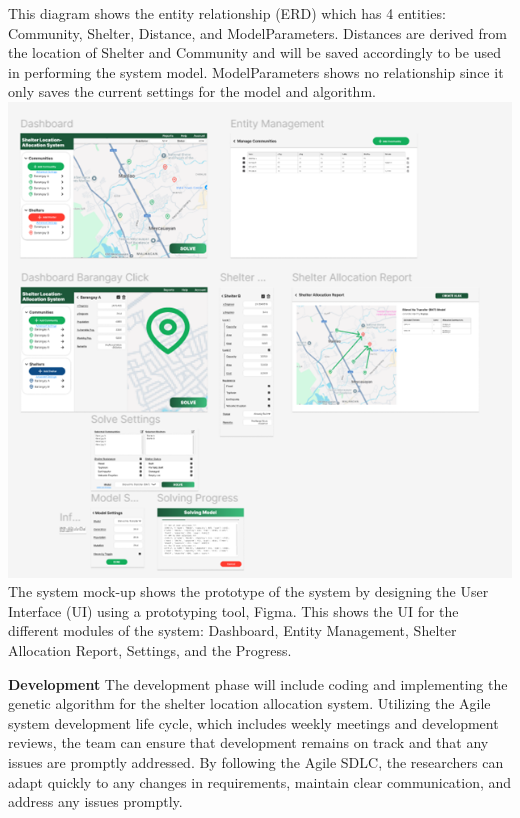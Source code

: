 This diagram shows the entity relationship (ERD) which has 4 entities: Community, Shelter, Distance, and ModelParameters. Distances are derived from the location of Shelter and Community and will be saved accordingly to be used in performing the system model. ModelParameters shows no relationship since it only saves the current settings for the model and algorithm.
\includegraphics{SYSTEM MOCKUP}
The system mock-up shows the prototype of the system by designing the User Interface (UI) using a prototyping tool, Figma. This shows the UI for the different modules of the system: Dashboard, Entity Management, Shelter Allocation Report, Settings, and the Progress.

\textbf{Development}
The development phase will include coding and implementing the genetic algorithm for the shelter location allocation system. Utilizing the Agile system development life cycle, which includes weekly meetings and development reviews, the team can ensure that development remains on track and that any issues are promptly addressed. By following the Agile SDLC, the researchers can adapt quickly to any changes in requirements, maintain clear communication, and address any issues promptly.

